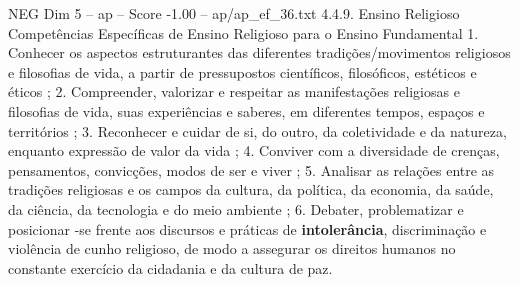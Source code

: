 \begin{textsample}{NEG Dim 5 – ap – Score -1.00 – ap/ap\_ef\_36.txt}  \label{ex:f5_neg_124}
4.4.9.
Ensino Religioso Competências Específicas de Ensino Religioso para o Ensino Fundamental 1.
Conhecer os aspectos estruturantes das diferentes tradições/movimentos religiosos e filosofias de vida, a partir de pressupostos científicos, filosóficos, estéticos e éticos ; 2.
Compreender, valorizar e respeitar as manifestações religiosas e filosofias de vida, suas experiências e saberes, em diferentes tempos, espaços e territórios ; 3.
Reconhecer e cuidar de si, do outro, da coletividade e da natureza, enquanto expressão de valor da vida ; 4.
Conviver com a diversidade de crenças, pensamentos, convicções, modos de ser e viver ; 5.
Analisar as relações entre as tradições religiosas e os campos da cultura, da política, da economia, da saúde, da ciência, da tecnologia e do meio ambiente ; 6.
Debater, problematizar e posicionar -se frente aos discursos e práticas de \textbf{intolerância}, discriminação e violência de cunho religioso, de modo a assegurar os direitos humanos no constante exercício da cidadania e da cultura de paz.

\end{textsample}
